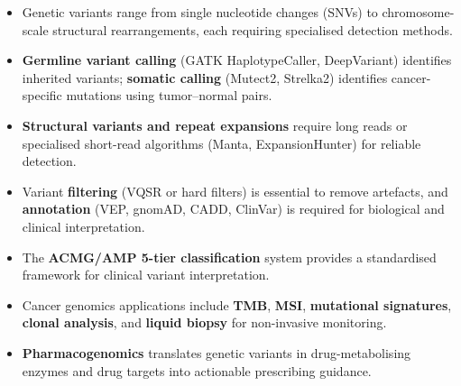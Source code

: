 \begin{keyconcept}[title={Chapter Summary}]
\begin{itemize}[nosep]
  \item Genetic variants range from single nucleotide changes (SNVs) to chromosome-scale structural rearrangements, each requiring specialised detection methods.
  \item \textbf{Germline variant calling} (GATK HaplotypeCaller, DeepVariant) identifies inherited variants; \textbf{somatic calling} (Mutect2, Strelka2) identifies cancer-specific mutations using tumor--normal pairs.
  \item \textbf{Structural variants and repeat expansions} require long reads or specialised short-read algorithms (Manta, ExpansionHunter) for reliable detection.
  \item Variant \textbf{filtering} (VQSR or hard filters) is essential to remove artefacts, and \textbf{annotation} (VEP, gnomAD, CADD, ClinVar) is required for biological and clinical interpretation.
  \item The \textbf{ACMG/AMP 5-tier classification} system provides a standardised framework for clinical variant interpretation.
  \item Cancer genomics applications include \textbf{TMB}, \textbf{MSI}, \textbf{mutational signatures}, \textbf{clonal analysis}, and \textbf{liquid biopsy} for non-invasive monitoring.
  \item \textbf{Pharmacogenomics} translates genetic variants in drug-metabolising enzymes and drug targets into actionable prescribing guidance.
\end{itemize}
\end{keyconcept}
